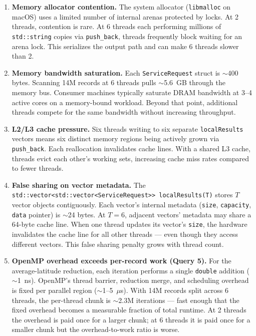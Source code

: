 \documentclass[12pt]{article}
\begin{document}
\begin{enumerate}
  \item \textbf{Memory allocator contention.}
    The system allocator (\texttt{libmalloc} on macOS) uses a limited number
    of internal arenas protected by locks. At 2 threads, contention is rare.
    At 6 threads each performing millions of \texttt{std::string} copies via
    \texttt{push\_back}, threads frequently block waiting for an arena lock.
    This serializes the output path and can make 6 threads slower than 2.

  \item \textbf{Memory bandwidth saturation.}
    Each \texttt{ServiceRequest} struct is $\sim$400 bytes. Scanning 14M
    records at 6 threads pulls $\sim$5.6~GB through the memory bus. Consumer
    machines typically saturate DRAM bandwidth at 3--4 active cores on a
    memory-bound workload. Beyond that point, additional threads compete for
    the same bandwidth without increasing throughput.

  \item \textbf{L2/L3 cache pressure.}
    Six threads writing to six separate \texttt{localResults} vectors means
    six distinct memory regions being actively grown via \texttt{push\_back}.
    Each reallocation invalidates cache lines. With a shared L3 cache, threads
    evict each other's working sets, increasing cache miss rates compared to
    fewer threads.

  \item \textbf{False sharing on vector metadata.}
    The \texttt{std::vector<std::vector<ServiceRequest>>~localResults(T)}
    stores $T$ vector objects contiguously. Each vector's internal metadata
    (\texttt{size}, \texttt{capacity}, \texttt{data} pointer) is $\sim$24
    bytes. At $T=6$, adjacent vectors' metadata may share a 64-byte cache
    line. When one thread updates its vector's \texttt{size}, the hardware
    invalidates the cache line for all other threads --- even though they
    access different vectors. This false sharing penalty grows with thread
    count.

  \item \textbf{OpenMP overhead exceeds per-record work (Query 5).}
    For the average-latitude reduction, each iteration performs a single
    \texttt{double} addition ($\sim$1~ns). OpenMP's thread barrier, reduction
    merge, and scheduling overhead is fixed per parallel region ($\sim$1--5~$\mu$s).
    With 14M records split across 6 threads, the per-thread chunk is
    $\sim$2.3M iterations --- fast enough that the fixed overhead becomes a
    measurable fraction of total runtime. At 2 threads the overhead is paid
    once for a larger chunk; at 6 threads it is paid once for a smaller chunk
    but the overhead-to-work ratio is worse.
\end{enumerate}
\end{document}
